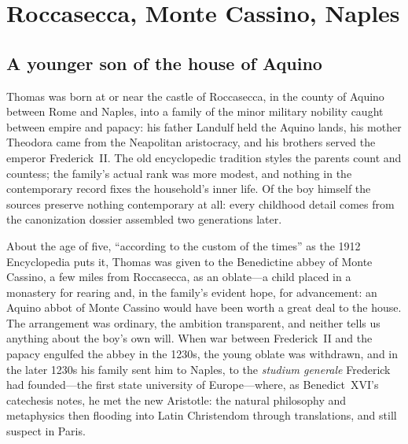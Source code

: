 \section{Roccasecca, Monte Cassino, Naples}

\subsection{A younger son of the house of Aquino}

Thomas was born at or near the castle of Roccasecca, in the county of
Aquino between Rome and Naples, into a family of the minor military
nobility caught between empire and papacy: his father Landulf held the
Aquino lands, his mother Theodora came from the Neapolitan aristocracy,
and his brothers served the emperor Frederick~II. The old encyclopedic
tradition styles the parents count and countess; the family's actual rank
was more modest, and nothing in the contemporary record fixes the
household's inner life. Of the boy himself the sources preserve nothing
contemporary at all: every childhood detail comes from the canonization
dossier assembled two generations later.


About the age of five, ``according to the custom of the times'' as the
1912 Encyclopedia puts it, Thomas was given to the Benedictine abbey of
Monte Cassino, a few miles from Roccasecca, as an oblate---a child placed
in a monastery for rearing and, in the family's evident hope, for
advancement: an Aquino abbot of Monte Cassino would have been worth a
great deal to the house. The arrangement was ordinary, the ambition
transparent, and neither tells us anything about the boy's own will. When
war between Frederick~II and the papacy engulfed the abbey in the 1230s,
the young oblate was withdrawn, and in the later 1230s his family sent him
to Naples, to the \textit{studium generale} Frederick had founded---the
first state university of Europe---where, as Benedict~XVI's catechesis
notes, he met the new Aristotle: the natural philosophy and metaphysics
then flooding into Latin Christendom through translations, and still
suspect in Paris.

